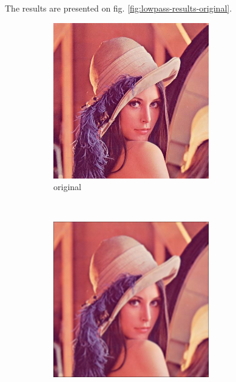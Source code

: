 \documentclass[12pt]{article}
\begin{document}
The results are presented on fig. \ref{fig:lowpass-results-original}.

\begin{figure}[ht]\centering
    \begin{subfigure}[t]{.4\textwidth}
        \includegraphics[width=\textwidth]{lenac_small.png}
        \caption{original}
    \end{subfigure}\\[2ex]
    \begin{subfigure}[t]{\subfiguresize}
        \includegraphics[width=\textwidth]{lenac_lowpass1.png}

\end{subfigure}
\end{figure}
\end{document}
